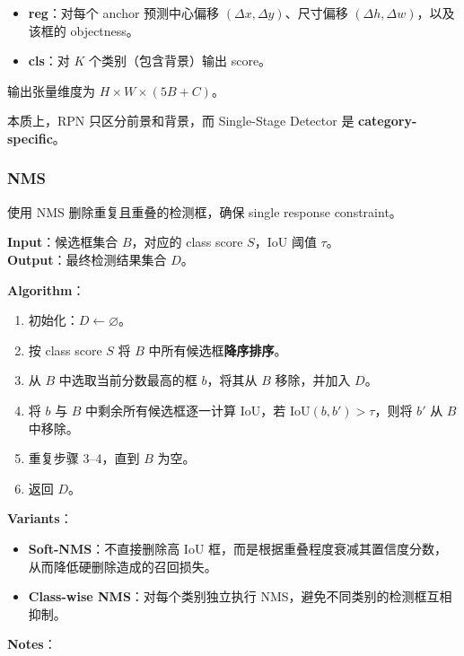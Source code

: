 \begin{itemize}
\tightlist
\item
  \textbf{reg}：对每个 anchor 预测中心偏移
  \((\Delta x, \Delta y)\)、尺寸偏移
  \((\Delta h, \Delta w)\)，以及该框的 objectness。
\item
  \textbf{cls}：对 \(K\) 个类别（包含背景）输出 score。
\end{itemize}

输出张量维度为 \(H \times W \times (5B + C)\)。

本质上，RPN 只区分前景和背景，而 Single-Stage Detector 是
\textbf{category-specific}。

\subsubsection{NMS}\label{nms}

使用 NMS 删除重复且重叠的检测框，确保 single response constraint。

\textbf{Input}：候选框集合 \(B\)，对应的 class score \(S\)，IoU 阈值
\(\tau\)。\\
\textbf{Output}：最终检测结果集合 \(D\)。

\textbf{Algorithm}：

\begin{enumerate}
\def\labelenumi{\arabic{enumi}.}
\tightlist
\item
  初始化：\(D \leftarrow \varnothing\)。
\item
  按 class score \(S\) 将 \(B\) 中所有候选框\textbf{降序排序}。
\item
  从 \(B\) 中选取当前分数最高的框 \(b\)，将其从 \(B\) 移除，并加入
  \(D\)。
\item
  将 \(b\) 与 \(B\) 中剩余所有候选框逐一计算 IoU，若
  \(\text{IoU}(b, b') > \tau\)，则将 \(b'\) 从 \(B\) 中移除。
\item
  重复步骤 3--4，直到 \(B\) 为空。
\item
  返回 \(D\)。
\end{enumerate}

\textbf{Variants}：

\begin{itemize}
\tightlist
\item
  \textbf{Soft-NMS}：不直接删除高 IoU
  框，而是根据重叠程度衰减其置信度分数，从而降低硬删除造成的召回损失。
\item
  \textbf{Class-wise NMS}：对每个类别独立执行
  NMS，避免不同类别的检测框互相抑制。
\end{itemize}

\textbf{Notes}：

